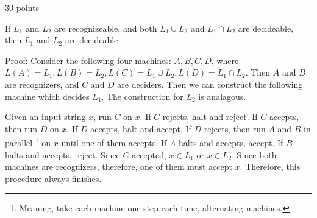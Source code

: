 \documentclass[12pt]
{article}
\newenvironment{proof}[1][Proof]{\begin{trivlist}
\item[\hskip \labelsep {\bfseries #1}]}{\end{trivlist}}
\begin{document}
\begin{proof}[Problem 6] 30 points

If $L_1$ and $L_2$ are recognizeable, and both $L_1 \cup L_2$ and $L_1 \cap
L_2$ are decideable, then $L_1$ and $L_2$ are decideable.

Proof: Consider the following four machines: $A,B,C,D$, where $L(A) =
L_1, L(B) = L_2, L(C) = L_1 \cup L_2, L(D) = L_1 \cap L_2$.  Then $A$
and $B$ are recognizers, and $C$ and $D$ are deciders.  Then we can
construct the following machine which decides $L_1$.  The construction
for $L_2$ is analagous.  

Given an input string $x$, run $C$ on $x$.  If $C$ rejects, halt and
reject.  If $C$ accepts, then run $D$ on $x$. If $D$ accepts, halt and
accept.  If $D$ rejects, then run $A$ and $B$ in parallel
\footnote{Meaning, take each machine one step each time, alternating
machines.}  on $x$ until one of them accepts.  If $A$ halts and
accepts, accept.  If $B$ halts and accepts, reject.  Since $C$
accepted, $x \in L_1$ or $x \in L_2$.  Since both
machines are recognizers, therefore, one of them must accept $x$.
Therefore, this procedure always finishes.  

\end{proof}
\end{document}
